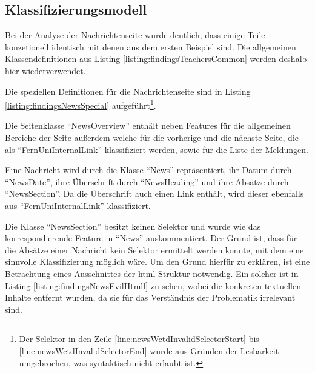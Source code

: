 \subsection{Klassifizierungsmodell}
    Bei der Analyse der Nachrichtenseite wurde deutlich,
    dass einige Teile konzetionell identisch mit denen aus dem ersten Beispiel sind.
    Die allgemeinen Klassendefinitionen aus Listing \ref{listing:findingsTeachersCommon}
    werden deshalb hier wiederverwendet.

    Die speziellen Definitionen für die Nachrichtenseite sind in
    Listing \ref{listing:findingsNewsSpecial}
    aufgeführt\footnote{Der Selektor in den Zeile \ref{line:newsWctdInvalidSelectorStart}
    bis \ref{line:newsWctdInvalidSelectorEnd} wurde aus Gründen der Lesbarkeit umgebrochen,
    was syntaktisch nicht erlaubt ist.}.

    

    Die Seitenklasse "`NewsOverview"' enthält neben Features für die
    allgemeinen Bereiche der Seite außerdem welche für die vorherige und die nächste
    Seite, die als "`FernUniInternalLink"' klassifiziert werden,
    sowie für die Liste der Meldungen.

    Eine Nachricht wird durch die Klasse "`News"' repräsentiert,
    ihr Datum durch "`NewsDate"', ihre Überschrift durch "`NewsHeading"'
    und ihre Absätze durch "`NewsSection"'.
    Da die Überschrift auch einen Link enthält,
    wird dieser ebenfalls aus "`FernUniInternalLink"' klassifiziert.

    Die Klasse "`NewsSection"' besitzt keinen Selektor und wurde wie das
    korrespondierende Feature in "`News"' auskommentiert.
    Der Grund ist, dass für die Absätze einer Nachricht kein Selektor ermittelt werden konnte,
    mit dem eine sinnvolle Klassifizierung möglich wäre.
    Um den Grund hierfür zu erklären, ist eine Betrachtung eines
    Ausschnittes der \gls{html}-Struktur notwendig.
    Ein solcher ist in Listing \ref{listing:findingsNewsEvilHtmll}
    zu sehen, wobei die konkreten textuellen Inhalte entfernt wurden,
    da sie für das Verständnis der Problematik irrelevant sind.

    

